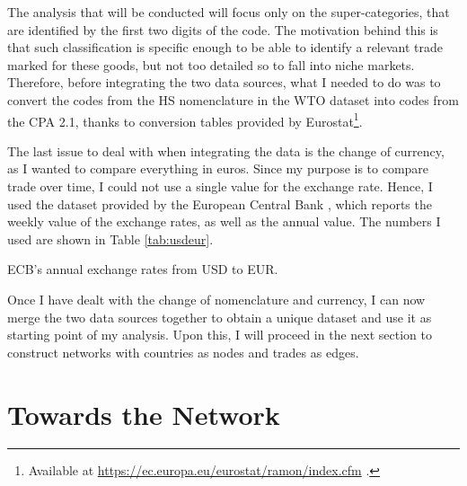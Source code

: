 The analysis that will be conducted will focus only on the super-categories, that are identified by the first two digits of the code. The motivation behind this is that such classification is specific enough to be able to identify a relevant trade marked for these goods, but not too detailed so to fall into niche markets.
Therefore, before integrating the two data sources, what I needed to do was to convert the codes from the HS nomenclature in the WTO dataset into codes from the CPA 2.1, thanks to conversion tables provided by Eurostat\footnote{Available at \url{https://ec.europa.eu/eurostat/ramon/index.cfm} .}.


The last issue to deal with when integrating the data is the change of currency, as I wanted to compare everything in euros. Since my purpose is to compare trade over time, I could not use a single value for the exchange rate. Hence, I used the dataset provided by the European Central Bank \cite{ecb2021usdeur}, which reports the weekly value of the exchange rates, as well as the annual value. The numbers I used are shown in Table \ref{tab:usdeur}.

\begin{table}
    \centering
    
    \caption{ECB's annual exchange rates from USD to EUR.}
    \label{tab:usdeur}
\end{table}

Once I have dealt with the change of nomenclature and currency, I can now merge the two data sources together to obtain a unique dataset and use it as starting point of my analysis. Upon this, I will proceed in the next section to construct networks with countries as nodes and trades as edges.

\section{Towards the Network}

